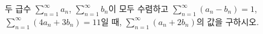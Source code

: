두 급수 $\displaystyle\sum_{n=1}^{\infty} a_n$, $\displaystyle\sum_{n=1}^{\infty} b_n$이 모두 수렴하고 $\displaystyle\sum_{n=1}^{\infty}(a_n-b_n)=1$, $\displaystyle\sum_{n=1}^{\infty}(4a_n+3b_n)=11$일 때, $\displaystyle\sum_{n=1}^{\infty}(a_n+2b_n)$의 값을 구하시오.
